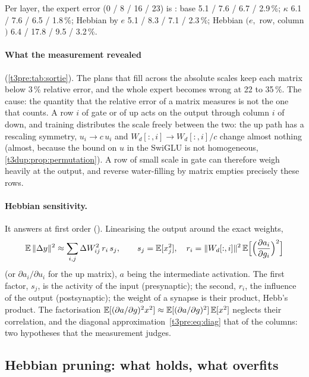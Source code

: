 Per layer, the expert error (0 / 8 / 16 / 23) is \mes: base 5.1 / 7.6 / 6.7 / 2.9\,\%; $\kappa$ 6.1 / 7.6 / 6.5 / 1.8\,\%; Hebbian by $e$ 5.1 / 8.3 / 7.1 / 2.3\,\%; Hebbian $(e,$ row, column$)$ 6.4 / 17.8 / 9.5 / 3.2\,\%.

\paragraph{What the measurement revealed} (\cref{t3pre:tab:sortie}). The plans that fill across the absolute scales keep each matrix below 3\,\% relative error, and the whole expert becomes wrong at 22 to 35\,\%. The cause: the quantity that the relative error of a matrix measures is not the one that counts. A row $i$ of gate or of up acts on the output through column $i$ of down, and training distributes the scale freely between the two: the up path has a rescaling symmetry, $u_i \to c\,u_i$ and $W_d[:, i] \to W_d[:, i]/c$ change almost nothing (almost, because the bound on $u$ in the SwiGLU is not homogeneous, \cref{t3dup:prop:permutation}). A row of small scale in gate can therefore weigh heavily at the output, and reverse water-filling by matrix empties precisely these rows.

\paragraph{Hebbian sensitivity.} It answers at first order (). Linearising the output around the exact weights,
\begin{equation}\label{t3pre:eq:hebb}
\mathbb{E}\,\|\Delta y\|^2 \approx \sum_{i,j} \Delta W_{ij}^2\, r_i\, s_j, \qquad s_j = \mathbb{E}[x_j^2], \quad r_i = \|W_d[:, i]\|^2\, \mathbb{E}\Bigl[\Bigl(\frac{\partial a_i}{\partial g_i}\Bigr)^2\Bigr]
\end{equation}
(or $\partial a_i / \partial u_i$ for the up matrix), $a$ being the intermediate activation. The first factor, $s_j$, is the activity of the input (presynaptic); the second, $r_i$, the influence of the output (postsynaptic); the weight of a synapse is their product, Hebb's product. The factorisation $\mathbb{E}[(\partial a/\partial g)^2 x^2] \approx \mathbb{E}[(\partial a/\partial g)^2]\,\mathbb{E}[x^2]$ neglects their correlation, and the diagonal approximation~\eqref{t3pre:eq:diag} that of the columns: two hypotheses that the measurement judges.

\subsection{Hebbian pruning: what holds, what overfits}

